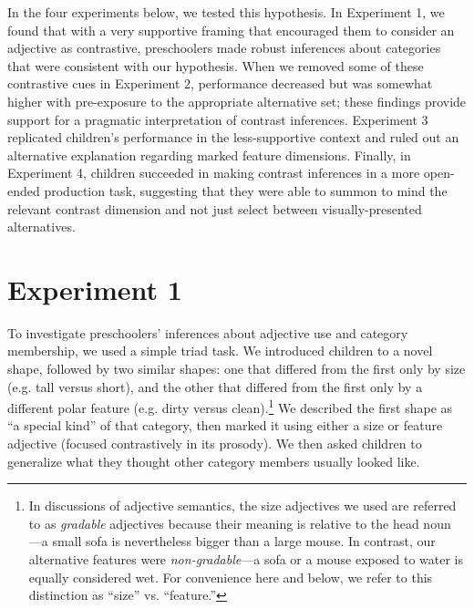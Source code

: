 \documentclass[man]{apa2}
\begin{document}
In the four experiments below, we tested this hypothesis. In Experiment 1, we found that with a very supportive framing that encouraged them to consider an adjective as contrastive, preschoolers made robust inferences about categories that were consistent with our hypothesis. When we removed some of these contrastive cues in Experiment 2, performance decreased but was somewhat higher with pre-exposure to the appropriate alternative set; these findings provide support for a pragmatic interpretation of contrast inferences. Experiment 3 replicated children's performance in the less-supportive context and ruled out an alternative explanation regarding marked feature dimensions. Finally, in Experiment 4, children succeeded in making contrast inferences in a more open-ended production task, suggesting that they were able to summon to mind the relevant contrast dimension and not just select between visually-presented alternatives. 

\section{Experiment 1}

To investigate preschoolers' inferences about adjective use and category membership, we used a simple triad task.  We introduced children to a novel shape, followed by two similar shapes: one that differed from the first only by size (e.g. tall versus short), and the other that differed from the first only by a different polar feature (e.g. dirty versus clean).\footnote{In discussions of adjective semantics, the size adjectives we used are referred to as \emph{gradable} adjectives because their meaning is relative to the head noun \cite{kennedy2012}---a small sofa is nevertheless bigger than a large mouse. In contrast, our alternative features were \emph{non-gradable}---a sofa or a mouse exposed to water is equally considered wet. For convenience here and below, we refer to this distinction as ``size'' vs. ``feature.''} We described the first shape as ``a special kind'' of that category, then marked it using either a size or feature adjective (focused contrastively in its prosody). We then asked children to generalize what they thought other category members usually looked like. 
\end{document}

